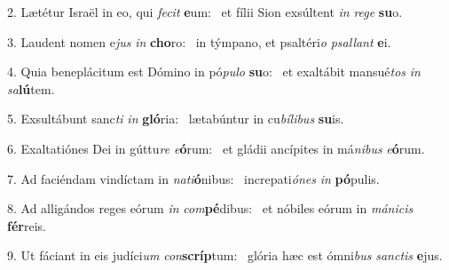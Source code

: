 2. Lætétur Israël in eo, qui \textit{fe}\textit{cit} \textbf{e}um: \ast\  et fílii Sion exsúltent \textit{in} \textit{re}\textit{ge} \textbf{su}o.\

3. Laudent nomen e\textit{jus} \textit{in} \textbf{cho}ro: \ast\  in týmpano, et psaltéri\textit{o} \textit{psal}\textit{lant} \textbf{e}i.\

4. Quia beneplácitum est Dómino in pó\textit{pu}\textit{lo} \textbf{su}o: \ast\  et exaltábit mansué\textit{tos} \textit{in} \textit{sa}\textbf{lú}tem.\

5. Exsultábunt sanc\textit{ti} \textit{in} \textbf{gló}ria: \ast\  lætabúntur in cu\textit{bí}\textit{li}\textit{bus} \textbf{su}is.\

6. Exaltatiónes Dei in gúttu\textit{re} \textit{e}\textbf{ó}rum: \ast\  et gládii ancípites in má\textit{ni}\textit{bus} \textit{e}\textbf{ó}rum.\

7. Ad faciéndam vindíctam in \textit{na}\textit{ti}\textbf{ó}nibus: \ast\  increpati\textit{ó}\textit{nes} \textit{in} \textbf{pó}pulis.\

8. Ad alligándos reges eórum \textit{in} \textit{com}\textbf{pé}dibus: \ast\  et nóbiles eórum in \textit{má}\textit{ni}\textit{cis} \textbf{fér}reis.\

9. Ut fáciant in eis judíci\textit{um} \textit{con}\textbf{scríp}tum: \ast\  glória hæc est ómni\textit{bus} \textit{sanc}\textit{tis} \textbf{e}jus.\

